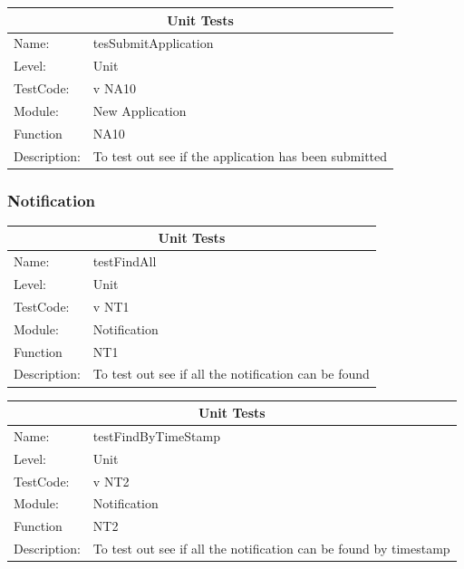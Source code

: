\documentclass[12pt]{article}
\begin{document}
\begin{center}
\begin{tabular}{|l|p{12cm}|}
\hline
\multicolumn{2}{|c|}{\bf Unit Tests} \\
\hline
 Name: & tesSubmitApplication \\
\hline
Level: & Unit \\
\hline
TestCode: & v NA10 \\
\hline
Module:& New Application\\
\hline
Function & NA10 \\
\hline
Description: & To test out see if the application has been submitted   \\
\hline

\end{tabular}
\end{center}

\subsubsection{Notification}
\begin{center}
\begin{tabular}{|l|p{12cm}|}
\hline
\multicolumn{2}{|c|}{\bf Unit Tests} \\
\hline
 Name: & testFindAll  \\
\hline
Level: & Unit \\
\hline
TestCode: & v NT1 \\
\hline
Module:& Notification\\
\hline
Function & NT1 \\
\hline
Description: & To test out see if all the notification can be found \\
\hline

\end{tabular}
\end{center}

\begin{center}
\begin{tabular}{|l|p{12cm}|}
\hline
\multicolumn{2}{|c|}{\bf Unit Tests} \\
\hline
 Name: & testFindByTimeStamp  \\
\hline
Level: & Unit \\
\hline
TestCode: & v NT2 \\
\hline
Module:& Notification\\
\hline
Function & NT2 \\
\hline
Description: & To test out see if all the notification can be found by timestamp \\
\hline

\end{tabular}
\end{center}
\end{document}
